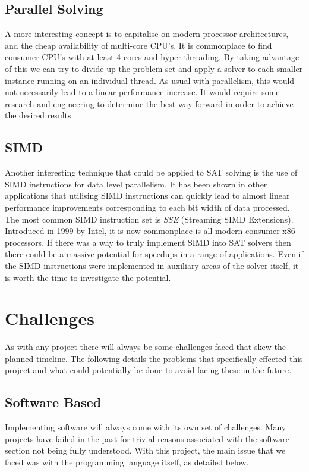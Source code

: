 \documentclass{article}
\begin{document}
\subsection{Parallel Solving}
A more interesting concept is to capitalise on modern processor architectures, and the cheap availability of multi-core CPU's. It
is commonplace to find consumer CPU's with at least 4 cores and hyper-threading. By taking advantage of this we can try to divide
up the problem set and apply a solver to each smaller instance running on an individual thread. As usual with parallelism, this
would not necessarily lead to a linear performance increase. It would require some research and engineering to determine the best
way forward in order to achieve the desired results.

\subsection{SIMD}
Another interesting technique that could be applied to SAT solving is the use of SIMD instructions for data level parallelism. It
has been shown in other applications that utilising SIMD instructions can quickly lead to almost linear performance improvements
corresponding to each bit width of data processed. The most common SIMD instruction set is \textit{SSE} (Streaming SIMD
Extensions). Introduced in 1999 by Intel, it is now commonplace is all modern consumer x86 processors. If there was a way to truly
implement SIMD into SAT solvers then there could be a massive potential for speedups in a range of applications. Even if the SIMD
instructions were implemented in auxiliary areas of the solver itself, it is worth the time to investigate the potential.

\section{Challenges}
As with any project there will always be some challenges faced that skew the planned timeline. The following details the problems
that specifically effected this project and what could potentially be done to avoid facing these in the future.

\subsection{Software Based}
Implementing software will always come with its own set of challenges. Many projects have failed in the past for trivial reasons
associated with the software section not being fully understood. With this project, the main issue that we faced was with the
programming language itself, as detailed below.
\end{document}
